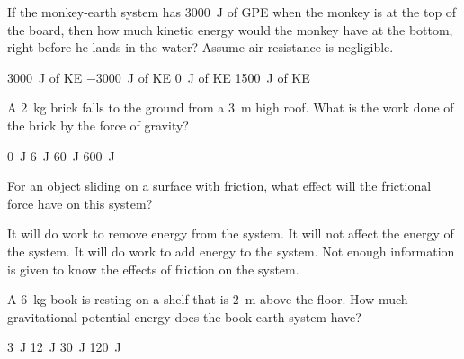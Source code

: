 \documentclass[answers,dvipsnames]{exam}
\begin{document}
\begin{questions}
\begin{center}
\end{center}

If the monkey-earth system has \SI{3000}{J} of GPE when the monkey is at the top of the board, then how much kinetic energy would the monkey have at the bottom, right before he lands in the water? Assume air resistance is negligible.

\begin{randomizechoices}[norandomize]
    \correctchoice \SI{3000}{J} of KE
    \choice \SI{-3000}{J} of KE
    \choice \SI{0}{J} of KE
    \choice \SI{1500}{J} of KE
\end{randomizechoices}

\question
A \SI{2}{kg} brick falls to the ground from a \SI{3}{m} high roof. What is the work done of the brick by the force of gravity?

\begin{randomizechoices}[norandomize]
    \choice \SI{0}{J}
    \choice \SI{6}{J}
    \correctchoice \SI{60}{J}
    \choice \SI{600}{J}
\end{randomizechoices}

\question 
For an object sliding on a surface with friction, what effect will the frictional force have on this system?

\begin{randomizechoices}[norandomize]
    \correctchoice It will do work to remove energy from the system.
    \choice It will not affect the energy of the system.
    \choice It will do work to add energy to the system.
    \choice Not enough information is given to know the effects of friction on the system.
\end{randomizechoices}

\question
A \SI{6}{kg} book is resting on a shelf that is \SI{2}{m} above the floor. How much gravitational potential energy does the book-earth system have?

\begin{randomizechoices}[norandomize]
    \choice \SI{3}{J}
    \choice \SI{12}{J}
    \choice \SI{30}{J}
    \correctchoice \SI{120}{J}
\end{randomizechoices}


\end{questions}
\end{document}
